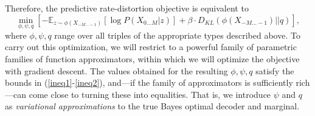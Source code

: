 \documentclass[11pt,letterpaper]{article}
\newif \ifcomment
\newcommand\rljf[1]{\ifcomment{{\color{blue}(#1)}}\else{}\fi}
\begin{document}
Therefore, the predictive rate-distortion objective is equivalent to
\begin{equation}\label{eq:bound}
	\min_{\phi, \psi, q}	\left[-	\mathbb{E}_{z \sim \phi(X_{-M\dots-1})}\left[\log P(X_{0\dots M} | z)\right] + \beta \cdot D_{KL}(\phi(X_{-M\dots-1}) || q)\right],
\end{equation}
where $\phi, \psi, q$ range over all triples of the appropriate types described above.
To carry out this optimization, we will restrict to a powerful family of parametric families of function approximators, within which we will optimize the objective with gradient descent.
The values obtained for the resulting $\phi, \psi, q$ satisfy the bounds in (\ref{ineq1}-\ref{ineq2}), and---if the family of approximators is sufficiently rich---can come close to turning these into equalities.
That is, we introduce $\psi$ and $q$ as \emph{variational approximations} \citep{blei-variational-2016} to the true Bayes optimal decoder and marginal. \rljf{Expand last sentence into a paragraph}



\end{document}
